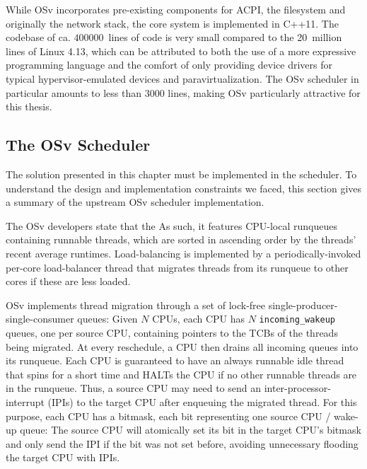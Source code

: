 \documentclass[12pt,a4paper]{book}
\begin{document}
While OSv incorporates pre-existing components for ACPI, the filesystem and originally the network stack, the core system is implemented in C++11.
The codebase of ca. $400000$~lines of code is very small compared to the 20~million lines of Linux 4.13, %
which can be attributed to both the use of a more expressive programming language and the comfort of only providing device drivers for typical hypervisor-emulated devices and paravirtualization.
The OSv scheduler in particular amounts to less than 3000 lines, making OSv particularly attractive for this thesis.%
~\cite{osvMain}

\subsection{The OSv Scheduler}\label{ch:di:osv:sched}
The solution presented in this chapter must be implemented in the scheduler.
To understand the design and implementation constraints we faced, this section gives a summary of the upstream OSv scheduler implementation.

The OSv developers state that the 
As such, it features CPU-local runqueues containing runnable threads, which are sorted in ascending order by the threads' recent average runtimes.
Load-balancing is implemented by a periodically-invoked per-core load-balancer thread that migrates threads from its runqueue to other cores if these are less loaded.~\cite{osvMain}

OSv implements thread migration through a set of lock-free single-producer-single-consumer queues:
Given $N$ CPUs, each CPU has $N$ \texttt{incoming\_wakeup} queues, one per source CPU, containing pointers to the TCBs of the threads being migrated.
At every reschedule, a CPU then drains all incoming queues into its runqueue.
Each CPU is guaranteed to have an always runnable idle thread that spins for a short time and HALTs the CPU if no other runnable threads are in the runqueue.
Thus, a source CPU may need to send an inter-processor-interrupt (IPIs) to the target CPU after enqueuing the migrated thread.
For this purpose, each CPU has a bitmask, each bit representing one source CPU / wake-up queue:
The source CPU will atomically set its bit in the target CPU's bitmask and only send the IPI if the bit was not set before, avoiding unnecessary flooding the target CPU with IPIs. ~\cite{osvGit,osvMain}
\end{document}
